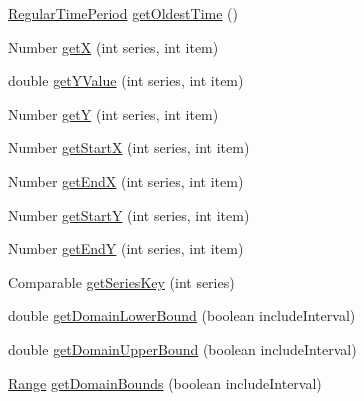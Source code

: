 \begin{DoxyCompactItemize}
\item 
\mbox{\hyperlink{classorg_1_1jfree_1_1data_1_1time_1_1_regular_time_period}{Regular\+Time\+Period}} \mbox{\hyperlink{classorg_1_1jfree_1_1data_1_1time_1_1_dynamic_time_series_collection_a2d617efe9eb25065ada7b93af24f9001}{get\+Oldest\+Time}} ()
\item 
Number \mbox{\hyperlink{classorg_1_1jfree_1_1data_1_1time_1_1_dynamic_time_series_collection_a8f658c59c2fa6d670e529c5e484a585e}{getX}} (int series, int item)
\item 
double \mbox{\hyperlink{classorg_1_1jfree_1_1data_1_1time_1_1_dynamic_time_series_collection_a9c955683707aa2d6cc74a4fde7d4cf7a}{get\+Y\+Value}} (int series, int item)
\item 
Number \mbox{\hyperlink{classorg_1_1jfree_1_1data_1_1time_1_1_dynamic_time_series_collection_a478c24e8f03cfbedd6464ea36d5d15f3}{getY}} (int series, int item)
\item 
Number \mbox{\hyperlink{classorg_1_1jfree_1_1data_1_1time_1_1_dynamic_time_series_collection_ac8f51b76cc0eede515c78e4cd22e7c53}{get\+StartX}} (int series, int item)
\item 
Number \mbox{\hyperlink{classorg_1_1jfree_1_1data_1_1time_1_1_dynamic_time_series_collection_ab9ced1fc76fea263d7a0ae0072e42f53}{get\+EndX}} (int series, int item)
\item 
Number \mbox{\hyperlink{classorg_1_1jfree_1_1data_1_1time_1_1_dynamic_time_series_collection_a9fb776918a455a76c7d03b80cc75703b}{get\+StartY}} (int series, int item)
\item 
Number \mbox{\hyperlink{classorg_1_1jfree_1_1data_1_1time_1_1_dynamic_time_series_collection_a06eb703a8006848633a99341f68a24c4}{get\+EndY}} (int series, int item)
\item 
Comparable \mbox{\hyperlink{classorg_1_1jfree_1_1data_1_1time_1_1_dynamic_time_series_collection_a138c01cd161ca774ab49979bb304d7f5}{get\+Series\+Key}} (int series)
\item 
double \mbox{\hyperlink{classorg_1_1jfree_1_1data_1_1time_1_1_dynamic_time_series_collection_afdb5cebf56ab6b2bfebf8cec7d734782}{get\+Domain\+Lower\+Bound}} (boolean include\+Interval)
\item 
double \mbox{\hyperlink{classorg_1_1jfree_1_1data_1_1time_1_1_dynamic_time_series_collection_a471679946440bd1e4a7b9fd2f8c7b21a}{get\+Domain\+Upper\+Bound}} (boolean include\+Interval)
\item 
\mbox{\hyperlink{classorg_1_1jfree_1_1data_1_1_range}{Range}} \mbox{\hyperlink{classorg_1_1jfree_1_1data_1_1time_1_1_dynamic_time_series_collection_ad6caf2b6e69b6d580a3c301dd786ca9e}{get\+Domain\+Bounds}} (boolean include\+Interval)

\end{DoxyCompactItemize}
